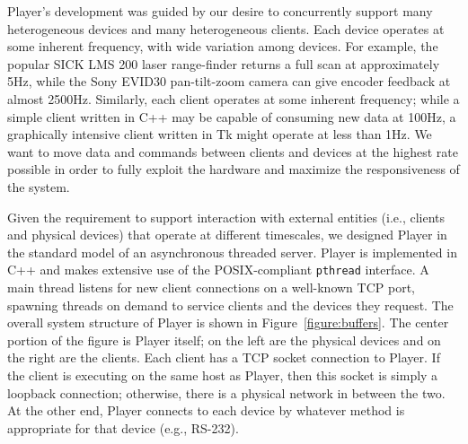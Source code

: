 \label{architecture}

Player's development was guided 
by our desire to concurrently support many heterogeneous devices and many
heterogeneous clients.  Each device operates at some inherent frequency, 
with wide variation among devices.
For example, the popular SICK LMS 200 laser range-finder 
returns a full scan at approximately
5Hz, while the Sony EVID30 pan-tilt-zoom camera can give encoder feedback 
at almost 2500Hz. 
Similarly, each client operates at some inherent frequency;
while a simple client written in C++ may be capable of consuming new data 
at 100Hz, a graphically intensive client written in Tk might operate
at less than 1Hz.  
We want to move data and commands between clients and devices
at the highest rate possible in order to fully exploit the hardware 
and maximize the responsiveness of the system.  

Given the requirement to support interaction with external entities
(i.e., clients and physical devices) that operate at different
timescales, we designed Player in the standard model of an
asynchronous threaded server.
Player is implemented in C++ and makes extensive use of the POSIX-compliant
{\tt pthread} interface. 
A main thread listens for new client connections on a well-known TCP
port, spawning threads on demand to service clients and the devices
they request.
The overall system structure of Player is shown in
Figure~\ref{figure:buffers}.  The center portion of the figure
is Player itself; on the left are the physical devices and
on the right are the clients.  Each client has
a TCP socket connection to Player. If the client is executing on the
same host as Player, then this socket is simply a loopback connection;
otherwise, there is a physical network in between the two.  At the other end,
Player connects to each device by whatever method is appropriate for
that device (e.g., RS-232).

